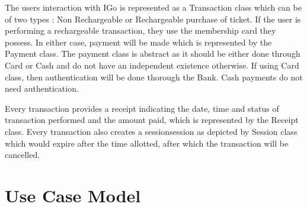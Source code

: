 \documentclass[12pt]{report}
\begin{document}
The users interaction with IGo is represented as a Transaction  class which can be of two types : Non Rechargeable or Rechargeable purchase of ticket. If the user is performing a rechargeable transaction, they use the membership card they possess. In either case, payment will be made which is represented by the Payment class. The payment class is abstract as it should be either done through Card or Cash and do not have an independent existence otherwise. If using Card class, then authentication will be done thorough the Bank. Cash payments do not need authentication.

Every transaction provides a receipt indicating the date, time and status of transaction performed and the amount paid, which is represented by the Receipt class. Every transaction also creates a session\gls{session} as depicted by Session class which would expire after the time allotted, after which the transaction will be cancelled.

\chapter{Use Case Model}
\end{document}

